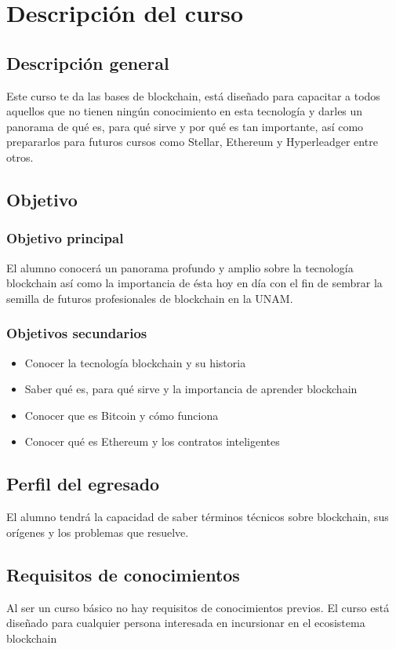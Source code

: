 \documentclass[a4paper,12pt]{/home/armando/Documentos/Cursos/LaTeX/Plantillas/lib/pub}
\begin{document}
\putLogo
\protecoTitle

\renewcommand{\contentsname}{Índice General}
\tableofcontents
\newpage

\section{Descripción del curso}
\selectfont
\subsection{Descripción general}
Este curso te da las bases de blockchain, está diseñado para capacitar a todos aquellos que no tienen ningún conocimiento en esta tecnología y darles un panorama de qué es, para qué sirve y por qué es tan importante, así como prepararlos para futuros cursos como Stellar, Ethereum y Hyperleadger entre otros.

\subsection{Objetivo}
\subsubsection{Objetivo principal}
El alumno conocerá un panorama profundo y amplio sobre la tecnología blockchain así como la importancia de ésta hoy en día con el fin de sembrar la semilla de futuros profesionales de blockchain en la UNAM.
\subsubsection{Objetivos secundarios}
\begin{itemize}
	\item Conocer la tecnología blockchain y su historia
	\item Saber qué es, para qué sirve y la importancia de aprender blockchain
	\item Conocer que es Bitcoin y cómo funciona
	\item Conocer qué es Ethereum y los contratos inteligentes
\end{itemize}
\subsection{Perfil del egresado}
El alumno tendrá la capacidad de saber términos técnicos sobre blockchain, sus orígenes y los problemas que resuelve.
\subsection{Requisitos de conocimientos}
Al ser un curso básico no hay requisitos de conocimientos previos. El curso está diseñado para cualquier persona interesada en incursionar en el ecosistema blockchain
\end{document}
